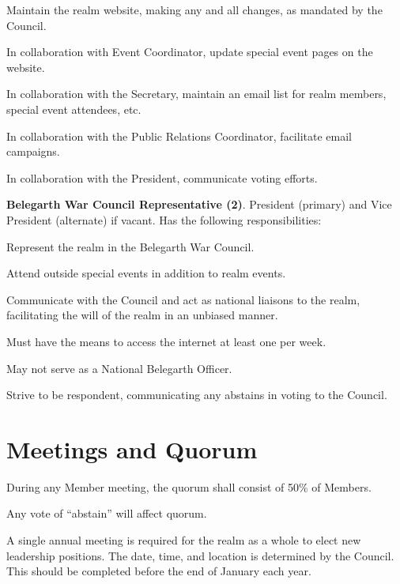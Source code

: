 \documentclass[12pt]{article}
\begin{document}
\begin{level}
\begin{level}
\begin{level}
        \item Maintain the realm website, making any and all changes, as mandated by the Council.
        \item In collaboration with Event Coordinator, update special event pages on the website.
        \item In collaboration with the Secretary, maintain an email list for realm members, special event attendees, etc.
        \item In collaboration with the Public Relations Coordinator, facilitate email campaigns.
        \item In collaboration with the President, communicate voting efforts.
    \end{level}
    \item \textbf{Belegarth War Council Representative (2)}. President (primary) and Vice President (alternate) if vacant. Has the following responsibilities:
    \begin{level}
        \item Represent the realm in the Belegarth War Council.
        \item Attend outside special events in addition to realm events.
        \item Communicate with the Council and act as national liaisons to the realm, facilitating the will of the realm in an unbiased manner.
        \item Must have the means to access the internet at least one per week.
        \item May not serve as a National Belegarth Officer.
        \item Strive to be respondent, communicating any abstains in voting to the Council.
    \end{level}
\end{level}

\end{level}

\section{Meetings and Quorum}\label{yearly_meeting}
\begin{level} 
    \item  During any Member meeting, the quorum shall consist of 50\% of Members.
    \begin{level} 
        \item Any vote of “abstain” will affect quorum.
    \end{level}
    \item A single annual meeting is required for the realm as a whole to elect new leadership positions. The date, time, and location is determined by the Council. This should be completed before the end of January each year.
\end{level}
\end{document}
